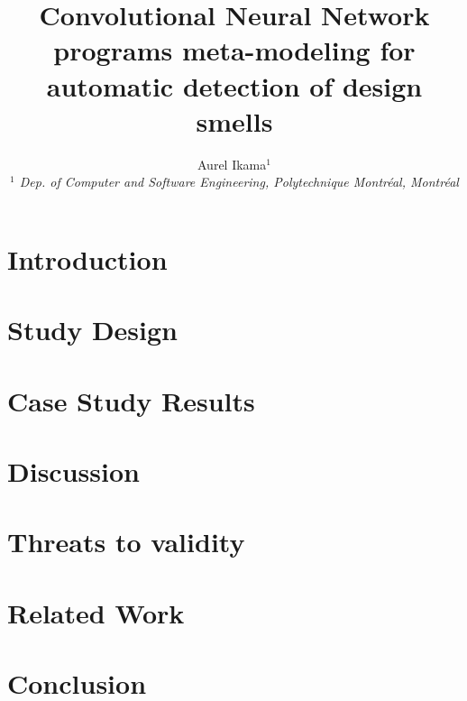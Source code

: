 \documentclass[10pt, conference]{IEEEtran}
\title{Convolutional Neural Network programs meta-modeling for automatic detection of design smells}
\author{Aurel Ikama$^{1}$
    \\
    \emph{$^{1}$ Dep. of Computer and Software Engineering, Polytechnique Montréal, Montréal}}
\begin{document}
\maketitle






\section{Introduction}

\section{Study Design}

\section{Case Study Results}




\section{Discussion}


\section{Threats to validity}


\section{Related Work}


\section{Conclusion}


\balance



\end{document}
